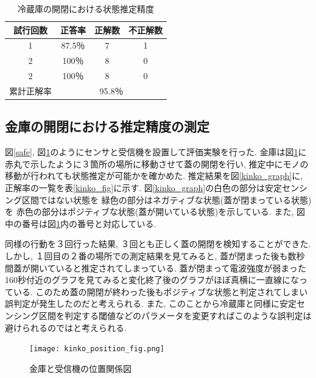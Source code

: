 \documentclass[Japanese]{dicomopapers}
\begin{document}
\begin{table}[htb]
    \begin{center}
        \caption{冷蔵庫の開閉における状態推定精度}
        \label{refrigerator_fig}
        \begin{tabular}{|c|c|c|c|} \hline
        試行回数 & 正答率 & 正解数 & 不正解数 \\ \hline
        1 & 87.5％ & 7 & 1 \\ \hline
        2 & 100％ & 8 & 0 \\ \hline
        2 & 100％ & 8 & 0 \\ \hline \hline
        累計正解率 & \multicolumn{3}{c|}{95.8％} \\ \hline
        \end{tabular}
    \end{center}
\end{table}



\subsection{金庫の開閉における推定精度の測定}
図\ref{safe}, 図\ref{kinko_position}のようにセンサと受信機を設置して評価実験を行った.
金庫は図\ref{kinko_position}に赤丸で示したように３箇所の場所に移動させて蓋の開閉を行い, 推定中にモノの移動が行われても状態推定が可能かを確かめた.
推定結果を図\ref{kinko_graph}に, 正解率の一覧を表\ref{kinko_fig}に示す.
図\ref{kinko_graph}の白色の部分は安定センシング区間ではない状態を 緑色の部分はネガティブな状態(蓋が閉まっている状態)を 赤色の部分はポジティブな状態(蓋が開いている状態)を示している.
また, 図中の番号は図\ref{kinko_position}内の番号と対応している.

同様の行動を３回行った結果, ３回とも正しく蓋の開閉を検知することができた.
しかし, １回目の２番の場所での測定結果を見てみると, 蓋が閉まった後も数秒間蓋が開いていると推定されてしまっている.
蓋が閉まって電波強度が弱まった160秒付近のグラフを見てみると変化終了後のグラフがほぼ真横に一直線になっている.
このため蓋の開閉が終わった後もポジティブな状態と判定されてしまい誤判定が発生したのだと考えられる.
また, このことから冷蔵庫と同様に安定センシング区間を判定する閾値などのパラメータを変更すればこのような誤判定は避けられるのではと考えられる.

\begin{figure}[ht]
    \centering
    \texttt{[image: kinko\_position\_fig.png]}
    \caption{金庫と受信機の位置関係図}
    \label{kinko_position}
\end{figure}
\end{document}
